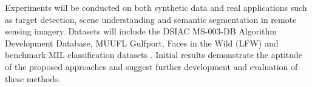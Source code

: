 Experiments will be conducted on both synthetic data and real applications such as target detection, scene understanding and semantic segmentation in remote sensing imagery.  Datasets will include the DSIAC MS-003-DB Algorithm Development Database, MUUFL Gulfport, Faces in the Wild (LFW) and benchmark MIL classification datasets \citep{DSIACATR,MUUFL,MUUFLSceneLabels,MUUFLScoringCode,LFW}.  Initial results demonstrate the aptitude of the proposed approaches and suggest further development and evaluation of these methods.




